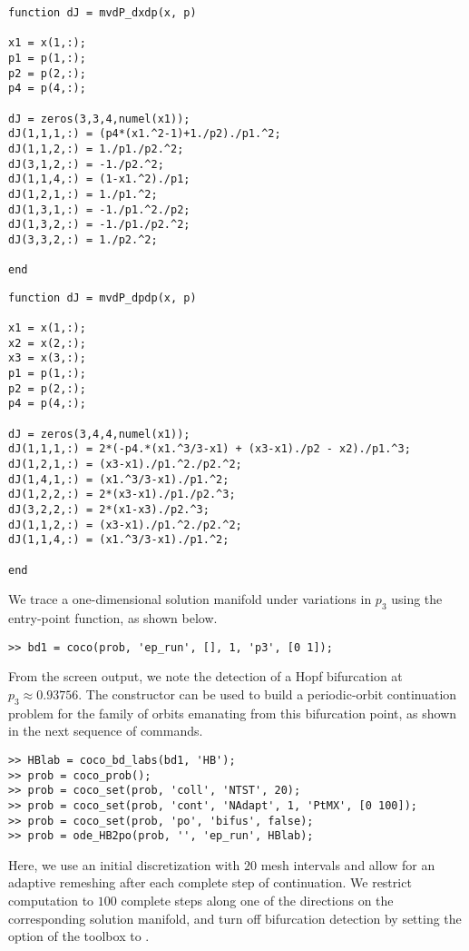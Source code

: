 \begin{lstlisting}[language=coco-highlight]
function dJ = mvdP_dxdp(x, p)

x1 = x(1,:);
p1 = p(1,:);
p2 = p(2,:);
p4 = p(4,:);

dJ = zeros(3,3,4,numel(x1));
dJ(1,1,1,:) = (p4*(x1.^2-1)+1./p2)./p1.^2;
dJ(1,1,2,:) = 1./p1./p2.^2;
dJ(3,1,2,:) = -1./p2.^2;
dJ(1,1,4,:) = (1-x1.^2)./p1;
dJ(1,2,1,:) = 1./p1.^2;
dJ(1,3,1,:) = -1./p1.^2./p2;
dJ(1,3,2,:) = -1./p1./p2.^2;
dJ(3,3,2,:) = 1./p2.^2;

end
\end{lstlisting}
\begin{lstlisting}[language=coco-highlight]
function dJ = mvdP_dpdp(x, p)

x1 = x(1,:);
x2 = x(2,:);
x3 = x(3,:);
p1 = p(1,:);
p2 = p(2,:);
p4 = p(4,:);

dJ = zeros(3,4,4,numel(x1));
dJ(1,1,1,:) = 2*(-p4.*(x1.^3/3-x1) + (x3-x1)./p2 - x2)./p1.^3;
dJ(1,2,1,:) = (x3-x1)./p1.^2./p2.^2;
dJ(1,4,1,:) = (x1.^3/3-x1)./p1.^2;
dJ(1,2,2,:) = 2*(x3-x1)./p1./p2.^3;
dJ(3,2,2,:) = 2*(x1-x3)./p2.^3;
dJ(1,1,2,:) = (x3-x1)./p1.^2./p2.^2;
dJ(1,1,4,:) = (x1.^3/3-x1)./p1.^2;

end
\end{lstlisting}
We trace a one-dimensional solution manifold under variations in $p_3$ using the  entry-point function, as shown below.
\begin{lstlisting}[language=coco-highlight]
>> bd1 = coco(prob, 'ep_run', [], 1, 'p3', [0 1]);
\end{lstlisting}
From the screen output, we note the detection of a Hopf bifurcation at $p_3\approx 0.93756$. The  constructor can be used to build a periodic-orbit continuation problem for the family of orbits emanating from this bifurcation point, as shown in the next sequence of commands.
\begin{lstlisting}[language=coco-highlight]
>> HBlab = coco_bd_labs(bd1, 'HB');
>> prob = coco_prob();
>> prob = coco_set(prob, 'coll', 'NTST', 20);
>> prob = coco_set(prob, 'cont', 'NAdapt', 1, 'PtMX', [0 100]);
>> prob = coco_set(prob, 'po', 'bifus', false);
>> prob = ode_HB2po(prob, '', 'ep_run', HBlab);
\end{lstlisting}
Here, we use an initial discretization with $20$ mesh intervals and allow for an adaptive remeshing after each complete step of continuation. We restrict computation to $100$ complete steps along one of the directions on the corresponding solution manifold, and turn off bifurcation detection by setting the  option of the  toolbox to .

